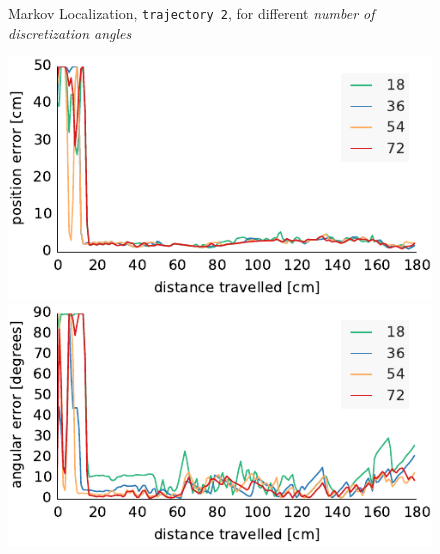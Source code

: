 \documentclass[letterpaper, 10pt, conference]{ieeeconf}
\begin{document}
\begin{figure}
\begin{center}
Markov Localization, \texttt{trajectory~2}, for different \emph{number of discretization angles}
\end{center}
\includegraphics{ml-whole_random_2-xy}\hfill
\includegraphics{ml-whole_random_2-theta}

\vspace{.5em}


\end{figure}
\end{document}
